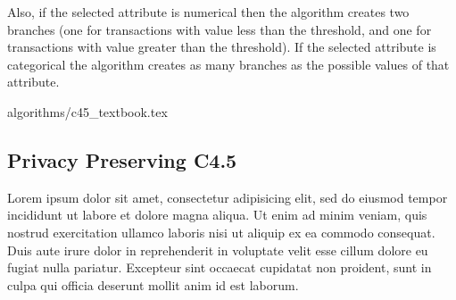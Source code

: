 Also, if the selected attribute is numerical then the algorithm creates two branches (one for transactions with value less than the threshold, and one for transactions with value greater than the threshold).
If the selected attribute is categorical the algorithm creates as many branches as the possible values of that attribute.

{algorithms/c45_textbook.tex}

\subsection{Privacy Preserving C4.5}\label{s:pp-c45}
Lorem ipsum dolor sit amet, consectetur adipisicing elit, sed do eiusmod tempor incididunt ut labore et dolore magna aliqua. Ut enim ad minim veniam, quis nostrud exercitation ullamco laboris nisi ut aliquip ex ea commodo consequat. Duis aute irure dolor in reprehenderit in voluptate velit esse cillum dolore eu fugiat nulla pariatur. Excepteur sint occaecat cupidatat non proident, sunt in culpa qui officia deserunt mollit anim id est laborum.


